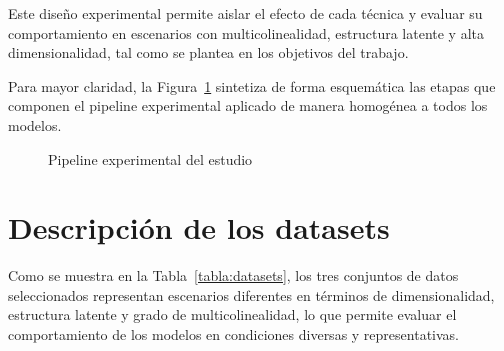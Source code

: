 \documentclass[12pt,a4paper]{report}
\begin{document}
Este diseño experimental permite aislar el efecto de cada técnica y evaluar su 
comportamiento en escenarios con multicolinealidad, estructura latente y alta 
dimensionalidad, tal como se plantea en los objetivos del trabajo.

Para mayor claridad, la Figura~\ref{fig:pipeline_experimental} sintetiza de forma 
esquemática las etapas que componen el pipeline experimental aplicado de manera 
homogénea a todos los modelos.

\begin{figure}[!htbp]
\centering


\caption{Pipeline experimental del estudio}
\label{fig:pipeline_experimental}

\end{figure}


\section{Descripción de los datasets}

Como se muestra en la Tabla~\ref{tabla:datasets}, los tres conjuntos de datos seleccionados representan escenarios diferentes en términos de dimensionalidad, estructura latente y grado de multicolinealidad, lo que permite evaluar el comportamiento de los modelos en condiciones diversas y representativas. 
\end{document}
